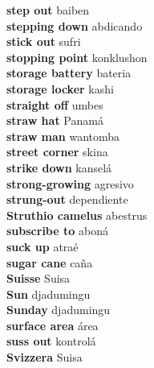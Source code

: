 \textbf{ step out  } baiben \\
\textbf{ stepping down  } abdicando \\
\textbf{ stick out  } sufri \\
\textbf{ stopping point  } konklushon \\
\textbf{ storage battery  } bateria \\
\textbf{ storage locker  } kashi \\
\textbf{ straight off  } umbes \\
\textbf{ straw hat  } Panamá \\
\textbf{ straw man  } wantomba \\
\textbf{ street corner  } skina \\
\textbf{ strike down  } kanselá \\
\textbf{ strong-growing  } agresivo \\
\textbf{ strung-out  } dependiente \\
\textbf{ Struthio camelus  } abestrus \\
\textbf{ subscribe to  } aboná \\
\textbf{ suck up  } atraé \\
\textbf{ sugar cane  } caña \\
\textbf{ Suisse  } Suisa \\
\textbf{ Sun  } djadumingu \\
\textbf{ Sunday  } djadumingu \\
\textbf{ surface area  } área \\
\textbf{ suss out  } kontrolá \\
\textbf{ Svizzera  } Suisa \\
